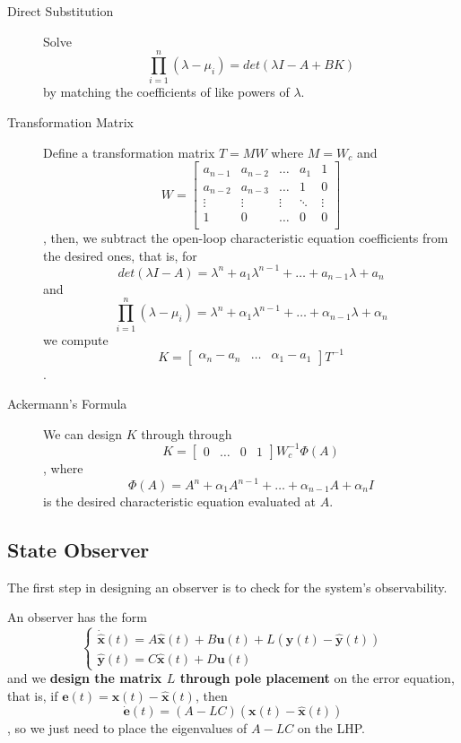 \documentclass[a4paper]{report}
\begin{document}
\begin{description}
    \item[Direct Substitution] Solve \[
	\prod_{i=1}^{n} \left(  \lambda - \mu_i\right) = det(\lambda I - A + BK)
    \] by matching the coefficients of like powers of $\lambda$.
    \item[Transformation Matrix] Define a transformation matrix $T = MW$ where $M=W_c$ and \[
    W =
    \begin{bmatrix}
	a_{n-1} & a_{n-2} & \ldots & a_1 & 1 \\
	a_{n-2} & a_{n-3} & \ldots & 1 & 0 \\
	\vdots & \vdots & \vdots & \ddots & \vdots \\
	1 & 0 & \ldots & 0 & 0 \\
    \end{bmatrix} 
    \], then, we subtract the open-loop characteristic equation coefficients from the desired ones, that is, for \[
    det(\lambda I - A) = \lambda^{n} + a_1\lambda^{n-1} + \ldots + a_{n-1}\lambda + a_n
    \] and \[
    \prod_{i=1}^{n} \left(  \lambda - \mu_i\right) = \lambda^{n} + \alpha_1\lambda^{n-1} + \ldots + \alpha_{n-1}\lambda + \alpha_n
    \] we compute \[
    K = \begin{bmatrix} \alpha_n - a_n & \ldots & \alpha_1 - a_1 \end{bmatrix} T^{-1}
    \].
    \item[Ackermann's Formula] We can design $K$ through through \[
	    K = \begin{bmatrix} 0 & \ldots & 0 & 1 \end{bmatrix} W_c^{-1}\Phi(A)
    \], where \[
	\Phi(A) = A^{n} + \alpha_1A^{n-1} + \ldots + \alpha_{n-1}A + \alpha_nI
	\] is the desired characteristic equation evaluated at $A$.
\end{description}

\subsection*{State Observer}

\begin{note}
    The first step in designing an observer is to check for the system's observability.
\end{note}

An observer has the form \[
\begin{cases}
    \dot{\bm{\hat{x}}}(t) = A\bm{\hat{x}}(t) + B\bm{u}(t) + L\left( \bm{y}(t) - \bm{\hat{y}}(t)\right) \\
    \bm{\hat{y}}(t) = C\bm{\hat{x}}(t) + D\bm{u}(t)
\end{cases}
\] and we \textbf{design the matrix $L$ through pole placement} on the error equation, that is, if $\bm{e}(t) = \bm{x}(t) - \bm{\hat{x}}(t)$, then \[
\bm{\dot{e}}(t) = \left( A-LC \right) \left( \bm{x}(t) - \bm{\hat{x}}(t) \right) 
\], so we just need to place the eigenvalues of $A-LC$ on the LHP.
\end{document}

